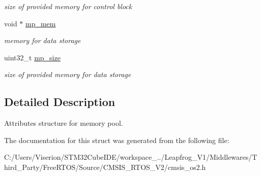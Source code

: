 \begin{DoxyCompactItemize}
\begin{DoxyCompactList}\small\item\em size of provided memory for control block \end{DoxyCompactList}\item 
\mbox{\label{structos_memory_pool_attr__t_adbf721bdd533e8a0e021ab2f4759a7ce}} 
void $\ast$ \mbox{\hyperlink{structos_memory_pool_attr__t_adbf721bdd533e8a0e021ab2f4759a7ce}{mp\+\_\+mem}}
\begin{DoxyCompactList}\small\item\em memory for data storage \end{DoxyCompactList}\item 
\mbox{\label{structos_memory_pool_attr__t_a170b59ba063d6d3f5387a23478db8d28}} 
uint32\+\_\+t \mbox{\hyperlink{structos_memory_pool_attr__t_a170b59ba063d6d3f5387a23478db8d28}{mp\+\_\+size}}
\begin{DoxyCompactList}\small\item\em size of provided memory for data storage \end{DoxyCompactList}\end{DoxyCompactItemize}


\subsection{Detailed Description}
Attributes structure for memory pool. 

The documentation for this struct was generated from the following file\+:\begin{DoxyCompactItemize}
\item 
C\+:/\+Users/\+Viserion/\+S\+T\+M32\+Cube\+I\+D\+E/workspace\+\_../\+Leapfrog\+\_\+\+V1/\+Middlewares/\+Third\+\_\+\+Party/\+Free\+R\+T\+O\+S/\+Source/\+C\+M\+S\+I\+S\+\_\+\+R\+T\+O\+S\+\_\+\+V2/cmsis\+\_\+os2.\+h\end{DoxyCompactItemize}
